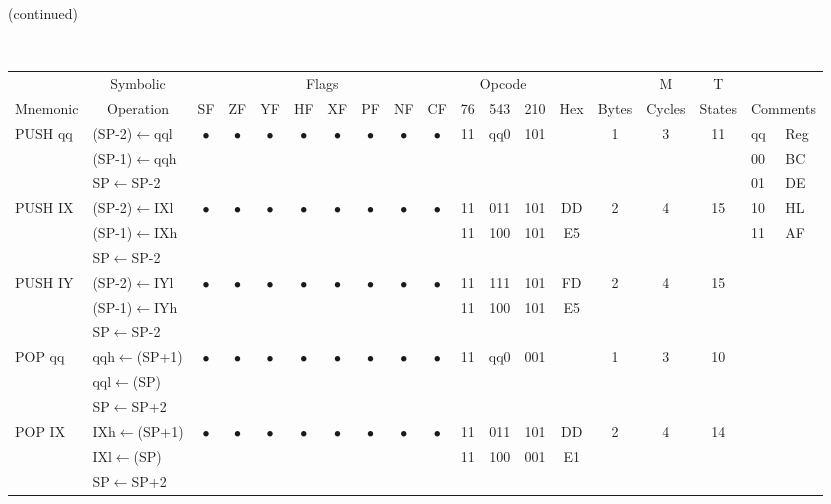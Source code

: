 \documentclass[oneside,a4paper]{book}
\begin{document}
(continued) \\
{\tt \scriptsize \setlength{\fboxsep}{0.25mm}
\setlength{\tabcolsep}{1mm}
\begin{tabular}{llc@{ }c@{ }c@{ }c@{ }c@{ }c@{ }c@{ }cc@{ }c@{ }cccccll}\hline
 & \multicolumn{1}{c}{Symbolic} & \multicolumn{8}{c}{Flags} & \multicolumn{3}{c}{Opcode} & & & M & T & \\
Mnemonic & \multicolumn{1}{c}{Operation} & SF & ZF & YF & HF & XF & PF & NF & CF & 76 & 543 & 210 
	& Hex & Bytes & Cycles & States & \multicolumn{2}{l}{Comments} \\ \hline

PUSH qq & (SP-2)$\leftarrow$qql &
	$\bullet$ & $\bullet$ & $\bullet$ & $\bullet$ & $\bullet$ & $\bullet$ & $\bullet$ & $\bullet$ & 11 & qq0 & 101 
	& & 1 & 3 & 11 & qq & Reg\\ \cline{18-19}
	& (SP-1)$\leftarrow$qqh & \multicolumn{15}{c}{} & 00 & BC\\
	& SP$\leftarrow$SP-2 & \multicolumn{15}{c}{} & 01 & DE\\

PUSH IX & (SP-2)$\leftarrow$IXl &
	$\bullet$ & $\bullet$ & $\bullet$ & $\bullet$ & $\bullet$ & $\bullet$ & $\bullet$ & $\bullet$ & 11 & 011 & 101 
	& DD & 2 & 4 & 15 & 10 & HL\\ 
	& (SP-1)$\leftarrow$IXh & \multicolumn{8}{c}{} & 11 & 100 & 101 & E5 & \multicolumn{3}{c}{} & 11 & AF\\
	& SP$\leftarrow$SP-2 & \multicolumn{15}{c}{} & & \\

PUSH IY & (SP-2)$\leftarrow$IYl &
	$\bullet$ & $\bullet$ & $\bullet$ & $\bullet$ & $\bullet$ & $\bullet$ & $\bullet$ & $\bullet$ & 11 & 111 & 101 
	& FD & 2 & 4 & 15 & & \\ 
	& (SP-1)$\leftarrow$IYh & \multicolumn{8}{c}{} & 11 & 100 & 101 & E5 & \multicolumn{3}{c}{} & & \\
	& SP$\leftarrow$SP-2 & \multicolumn{15}{c}{} & & \\

POP qq & qqh$\leftarrow$(SP+1) &
	$\bullet$ & $\bullet$ & $\bullet$ & $\bullet$ & $\bullet$ & $\bullet$ & $\bullet$ & $\bullet$ & 11 & qq0 & 001 
	& & 1 & 3 & 10 & & \\
	& qql$\leftarrow$(SP) & \multicolumn{15}{c}{} & & \\
	& SP$\leftarrow$SP+2 & \multicolumn{15}{c}{} & & \\

POP IX & IXh$\leftarrow$(SP+1) &
	$\bullet$ & $\bullet$ & $\bullet$ & $\bullet$ & $\bullet$ & $\bullet$ & $\bullet$ & $\bullet$ & 11 & 011 & 101 
	& DD & 2 & 4 & 14 & & \\ 
	& IXl$\leftarrow$(SP) & \multicolumn{8}{c}{} & 11 & 100 & 001 & E1 & \multicolumn{3}{c}{} & & \\
	& SP$\leftarrow$SP+2 & \multicolumn{15}{c}{} & & \\


\end{tabular}}
\end{document}
